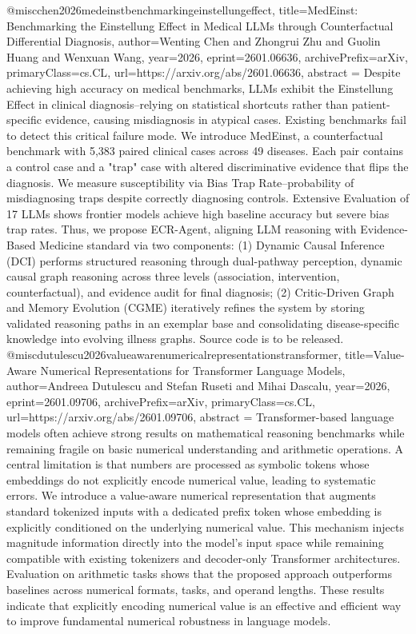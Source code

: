 {}@misc{chen2026medeinstbenchmarkingeinstellungeffect,
      title={MedEinst: Benchmarking the Einstellung Effect in Medical LLMs through Counterfactual Differential Diagnosis}, 
      author={Wenting Chen and Zhongrui Zhu and Guolin Huang and Wenxuan Wang},
      year={2026},
      eprint={2601.06636},
      archivePrefix={arXiv},
      primaryClass={cs.CL},
      url={https://arxiv.org/abs/2601.06636},
      abstract = {Despite achieving high accuracy on medical benchmarks, LLMs exhibit the Einstellung Effect in clinical diagnosis--relying on statistical shortcuts rather than patient-specific evidence, causing misdiagnosis in atypical cases. Existing benchmarks fail to detect this critical failure mode. We introduce MedEinst, a counterfactual benchmark with 5,383 paired clinical cases across 49 diseases. Each pair contains a control case and a "trap" case with altered discriminative evidence that flips the diagnosis. We measure susceptibility via Bias Trap Rate--probability of misdiagnosing traps despite correctly diagnosing controls. Extensive Evaluation of 17 LLMs shows frontier models achieve high baseline accuracy but severe bias trap rates. Thus, we propose ECR-Agent, aligning LLM reasoning with Evidence-Based Medicine standard via two components: (1) Dynamic Causal Inference (DCI) performs structured reasoning through dual-pathway perception, dynamic causal graph reasoning across three levels (association, intervention, counterfactual), and evidence audit for final diagnosis; (2) Critic-Driven Graph and Memory Evolution (CGME) iteratively refines the system by storing validated reasoning paths in an exemplar base and consolidating disease-specific knowledge into evolving illness graphs. Source code is to be released.}
}@misc{dutulescu2026valueawarenumericalrepresentationstransformer,
      title={Value-Aware Numerical Representations for Transformer Language Models}, 
      author={Andreea Dutulescu and Stefan Ruseti and Mihai Dascalu},
      year={2026},
      eprint={2601.09706},
      archivePrefix={arXiv},
      primaryClass={cs.CL},
      url={https://arxiv.org/abs/2601.09706},
      abstract = {Transformer-based language models often achieve strong results on mathematical reasoning benchmarks while remaining fragile on basic numerical understanding and arithmetic operations. A central limitation is that numbers are processed as symbolic tokens whose embeddings do not explicitly encode numerical value, leading to systematic errors. We introduce a value-aware numerical representation that augments standard tokenized inputs with a dedicated prefix token whose embedding is explicitly conditioned on the underlying numerical value. This mechanism injects magnitude information directly into the model's input space while remaining compatible with existing tokenizers and decoder-only Transformer architectures. Evaluation on arithmetic tasks shows that the proposed approach outperforms baselines across numerical formats, tasks, and operand lengths. These results indicate that explicitly encoding numerical value is an effective and efficient way to improve fundamental numerical robustness in language models.}
}
